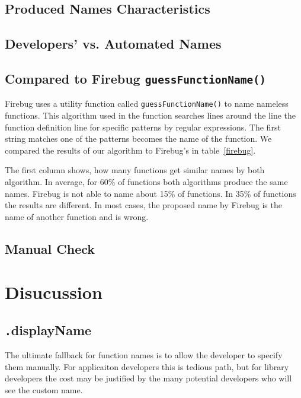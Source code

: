 \documentclass[10pt, preprint]{sigplanconf}
\begin{document}
{\subsection{Produced Names Characteristics}

\subsection{Developers' vs. Automated Names}

\subsection{Compared to Firebug {\large \texttt{guessFunctionName()}}}
Firebug uses a utility function called {\small \texttt{guessFunctionName()}} to name nameless functions.
This algorithm used in the function searches lines around the line the function definition line for specific patterns by regular expressions. The
  first string matches one of the patterns becomes the name of the function. We compared the results of our algorithm to Firebug's in table~\ref{firebug}.
  
The first column shows, how many functions get similar names by both algorithm. In average, for 60\% of functions both algorithms produce the same names.
Firebug is not able to name about 15\% of functions. In 35\% of functions the results are different. In most cases, the proposed name by Firebug is the name of another function and is wrong.
   

\subsection{Manual Check}



\section{Disucussion}

\subsection{ {\texttt .displayName} }
The ultimate fallback for function names is to allow the developer to specify them manually. For applicaiton developers this is tedious path, but for library developers the cost may be justified by the many potential developers who will see the custom name.

}
\end{document}
